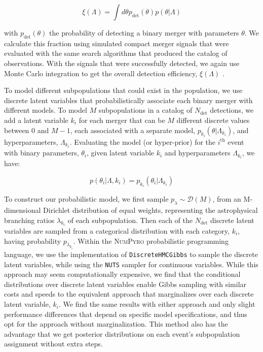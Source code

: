 \begin{equation} \label{eq:detfrac}
    \xi(\Lambda) = \int d\theta p_\mathrm{det}(\theta) p(\theta | \Lambda)
\end{equation}

\noindent with $p_\mathrm{det}(\theta)$ the probability of detecting a binary merger with parameters $\theta$. We calculate this fraction using simulated compact merger signals that were evaluated with the same search algorithms that produced the catalog of observations. With the signals that were successfully detected, we again use Monte Carlo integration to get the overall detection efficiency, $\xi(\Lambda)$ \citep{1712.00482, 1904.10879, 2204.00461}.


To model different subpopulations that could exist in the population, we use discrete latent variables that probabilistically associate each binary merger with different models. To model $M$ subpopulations in a catalog of $N_\mathrm{det}$ detections, we add a latent variable $k_i$ for each merger that can be $M$ different discrete values between $0$ and $M-1$, each associated with a separate model, $p_{k_i}(\theta | \Lambda_{k_i})$, and hyperparameters, $\Lambda_{k_i}$. Evaluating the model (or hyper-prior) for the $i^\mathrm{th}$ event with binary parameters, $\theta_i$, given latent variable $k_i$ and hyperparameters $\Lambda_{k_i}$, we have:

\begin{equation} \label{eq:latent}
    p(\theta_i | \Lambda, k_i) = p_{k_i}(\theta_i | \Lambda_{k_i})
\end{equation}

\noindent To construct our probabilistic model, we first sample $p_{\lambda} \sim \mathcal{D}(M)$, from an M-dimensional Dirichlet distribution of equal weights, representing the astrophysical branching ratios $\lambda_{k_i}$ of each subpopulation. Then each of the $N_\mathrm{det}$ discrete latent variables are sampled from a categorical distribution with each category, $k_i$, having probability $p_{\lambda_{k_i}}$. Within the \textsc{NumPyro} \citep{1810.09538,1912.11554} probabilistic programming language, we use the implementation of \texttt{DiscreteHMCGibbs} \citep{Liu1996PeskunsTA} to sample the discrete latent variables, while using the \texttt{NUTS} \citep{1111.4246} sampler for continuous variables. While this approach may seem computationally expensive, we find that the conditional distributions over discrete latent variables enable Gibbs sampling with similar costs and speeds to the equivalent approach that marginalizes over each discrete latent variable, $k_i$. We find the same results with either approach and only slight performance differences that depend on specific model specifications, and thus opt for the approach without marginalization. This method also has the advantage that we get posterior distributions on each event's subpopulation assignment without extra steps.

